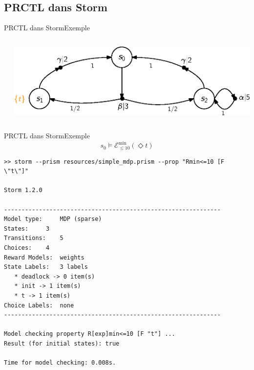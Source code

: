 \documentclass[compress]{beamer}
\begin{document}
\subsection{PRCTL dans Storm}
\begin{frame}{PRCTL dans Storm}{Exemple}
\begin{columns}
  \begin{column}{0.35\linewidth}

  \end{column}
  \begin{column}{0.65\linewidth}
    \begin{center}
      \includegraphics[width=\linewidth]{resources/simple_mdp}
    \end{center}
  \end{column}
\end{columns}
\end{frame}

\begin{frame}[fragile]{PRCTL dans Storm}{Exemple}
\vspace{-0.05\linewidth}
  \[
    s_0 \models \mathcal{E}_{\leq 10}^{\min}(\Diamond t)
  \]
  {\tiny
  \begin{verbatim}
>> storm --prism resources/simple_mdp.prism --prop "Rmin<=10 [F \"t\"]"

Storm 1.2.0

--------------------------------------------------------------
Model type: 	MDP (sparse)
States: 	3
Transitions: 	5
Choices: 	4
Reward Models:  weights
State Labels: 	3 labels
   * deadlock -> 0 item(s)
   * init -> 1 item(s)
   * t -> 1 item(s)
Choice Labels: 	none
--------------------------------------------------------------

Model checking property R[exp]min<=10 [F "t"] ...
Result (for initial states): true

Time for model checking: 0.008s.
  \end{verbatim}
  }
\end{frame}
\end{document}
